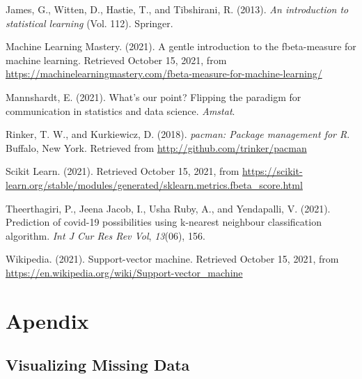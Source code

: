 \documentclass[
  10pt,
]{article}
\begin{document}
\leavevmode\hypertarget{ref-james2013introduction}{}%
James, G., Witten, D., Hastie, T., and Tibshirani, R. (2013). \emph{An introduction to statistical learning} (Vol. 112). Springer.

\leavevmode\hypertarget{ref-MLM}{}%
Machine Learning Mastery. (2021). A gentle introduction to the fbeta-measure for machine learning. Retrieved October 15, 2021, from \url{https://machinelearningmastery.com/fbeta-measure-for-machine-learning/}

\leavevmode\hypertarget{ref-elizabeth_flip}{}%
Mannshardt, E. (2021). What's our point? Flipping the paradigm for communication in statistics and data science. \emph{Amstat}.

\leavevmode\hypertarget{ref-pacman}{}%
Rinker, T. W., and Kurkiewicz, D. (2018). \emph{pacman: Package management for R}. Buffalo, New York. Retrieved from \url{http://github.com/trinker/pacman}

\leavevmode\hypertarget{ref-scikit_learn}{}%
Scikit Learn. (2021). Retrieved October 15, 2021, from \url{https://scikit-learn.org/stable/modules/generated/sklearn.metrics.fbeta_score.html}

\leavevmode\hypertarget{ref-theerthagiri2021prediction}{}%
Theerthagiri, P., Jeena Jacob, I., Usha Ruby, A., and Yendapalli, V. (2021). Prediction of covid-19 possibilities using k-nearest neighbour classification algorithm. \emph{Int J Cur Res Rev\textbar{} Vol}, \emph{13}(06), 156.

\leavevmode\hypertarget{ref-wikipedia}{}%
Wikipedia. (2021). Support-vector machine. Retrieved October 15, 2021, from \url{https://en.wikipedia.org/wiki/Support-vector_machine}

\newpage

\hypertarget{apendix}{%
\section*{Apendix}\label{apendix}}

\hypertarget{visualizing-missing-data}{%
\subsection{Visualizing Missing Data}\label{visualizing-missing-data}}
\end{document}
